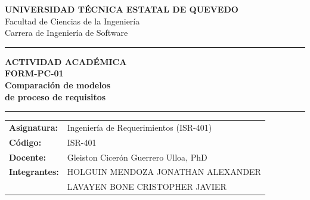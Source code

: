 \documentclass[11pt,a4paper]{article}
\begin{document}
	
	
	\begin{titlepage}
		\centering
		
		{\large\textbf{UNIVERSIDAD TÉCNICA ESTATAL DE QUEVEDO}}\\[0.3cm]
		
		{\normalsize Facultad de Ciencias de la Ingeniería}\\[0.15cm]
		{\normalsize Carrera de Ingeniería de Software}
		
		\vspace{1.5cm}
		
		{\color{azulTabla}\rule{0.85\textwidth}{1.5pt}}
		
		\vspace{1.2cm}
		
		{\large\textcolor{azulTabla}{\textbf{ACTIVIDAD ACADÉMICA}}}\\[0.5cm]
		
		{\Large\textbf{FORM-PC-01}}\\[0.8cm]
		
		{\LARGE\bfseries
			Comparación de modelos\\[0.2cm]
			de proceso de requisitos
		}
		
		\vspace{1.2cm}
		
		{\color{azulTabla}\rule{0.85\textwidth}{1.5pt}}
		
		\vspace{0.8cm}
		
		\begin{minipage}{0.85\textwidth}
			\renewcommand{\arraystretch}{1.7}
			
			\begin{tabular}{@{}>{\bfseries}p{3.2cm}p{9cm}@{}}
				
				Asignatura: &
				Ingeniería de Requerimientos (ISR-401) \\
				
				Código: &
				ISR-401 \\
				
				Docente: &
				Gleiston Cicerón Guerrero Ulloa, PhD \\
				
				Integrantes: &
				HOLGUIN MENDOZA JONATHAN ALEXANDER \\
				
				&
				LAVAYEN BONE CRISTOPHER JAVIER \\
				

\end{tabular}
\end{minipage}
\end{titlepage}
\end{document}
